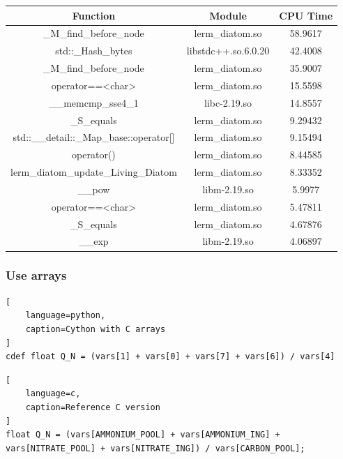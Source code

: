 \documentclass[t]{beamer}
\begin{document}
\begin{frame}[c]
	\small
	\begin{table}
	    \begin{tabular}{|c|c||c|}
	    \hline
	    Function                                 & Module              & CPU Time               \\ \hline
	    \rowcolor{babyblue}
	    \_M\_find\_before\_node                  & lerm\_diatom.so     & 58.9617 \\
	    \rowcolor{babyblue}
	    std::\_Hash\_bytes                       & libstdc++.so.6.0.20 & 42.4008  \\
	    \rowcolor{babyblue}
	    \_M\_find\_before\_node                  & lerm\_diatom.so     & 35.9007 \\
	    \rowcolor{babyblue}
	    operator==\textless char\textgreater     & lerm\_diatom.so     & 15.5598 \\
	    \rowcolor{babyblue}
	    \_\_memcmp\_sse4\_1                      & libc-2.19.so        & 14.8557         \\
	    \rowcolor{babyblue}
	    \_S\_equals                              & lerm\_diatom.so     & 9.29432 \\
	    \rowcolor{babyblue}
	    std::\_\_detail::\_Map\_base::operator[] & lerm\_diatom.so     & 9.15494 \\
	    \rowcolor{babyblue}
	    operator()                               & lerm\_diatom.so     & 8.44585 \\
	    lerm\_diatom\_update\_Living\_Diatom     & lerm\_diatom.so     & 8.33352 \\
	    \_\_pow                                  & libm-2.19.so        & 5.9977          \\
	    \rowcolor{babyblue}
	    operator==\textless char\textgreater     & lerm\_diatom.so     & 5.47811 \\
	    \rowcolor{babyblue}
	    \_S\_equals                              & lerm\_diatom.so     & 4.67876 \\
	    \_\_exp                                  & libm-2.19.so        & 4.06897       \\ \hline
	    \end{tabular}
	\end{table}
\end{frame}


\begin{frame}[fragile,c]
\frametitle{\huge Use arrays}
\begin{lstlisting}[
	language=python,
	caption=Cython with C arrays
]
cdef float Q_N = (vars[1] + vars[0] + vars[7] + vars[6]) / vars[4]
\end{lstlisting}

\begin{lstlisting}[
	language=c,
	caption=Reference C version
]
float Q_N = (vars[AMMONIUM_POOL] + vars[AMMONIUM_ING] + vars[NITRATE_POOL] + vars[NITRATE_ING]) / vars[CARBON_POOL];
\end{lstlisting}
\end{frame}
\end{document}
